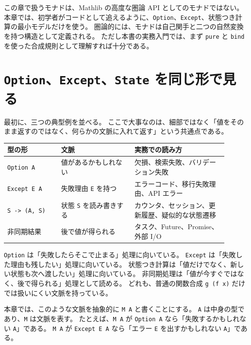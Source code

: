 
この章で扱うモナドは、Mathlib の高度な圏論 API としてのモナドではない。
本章では、初学者がコードとして追えるように、\texttt{Option}、\texttt{Except}、状態つき計算の最小モデルだけを使う。
圏論的には、モナドは自己関手と二つの自然変換を持つ構造として定義される。
ただし本書の実務入門では、まず \texttt{pure} と \texttt{bind} を使った合成規則として理解すれば十分である。

\section{\texttt{Option}、\texttt{Except}、\texttt{State} を同じ形で見る}

最初に、三つの典型例を並べる。
ここで大事なのは、細部ではなく「値をそのまま返すのではなく、何らかの文脈に入れて返す」という共通点である。

\begin{center}
\begin{tabular}{p{0.22\linewidth}p{0.30\linewidth}p{0.38\linewidth}}
\toprule
型の形 & 文脈 & 実務での読み方 \\
\midrule
\texttt{Option A} & 値があるかもしれない & 欠損、検索失敗、バリデーション失敗 \\
\texttt{Except E A} & 失敗理由 \texttt{E} を持つ & エラーコード、移行失敗理由、API エラー \\
\texttt{S -> (A, S)} & 状態 \texttt{S} を読み書きする & カウンタ、セッション、更新履歴、疑似的な状態遷移 \\
非同期結果 & 後で値が得られる & タスク、Future、Promise、外部 I/O \\
\bottomrule
\end{tabular}
\end{center}

\begin{softwarebox}
\texttt{Option} は「失敗したらそこで止まる」処理に向いている。
\texttt{Except} は「失敗した理由も残したい」処理に向いている。
状態つき計算は「値だけでなく、新しい状態も次へ渡したい」処理に向いている。
非同期処理は「値が今すぐではなく、後で得られる」処理として読める。
どれも、普通の関数合成 \texttt{g (f x)} だけでは扱いにくい文脈を持っている。
\end{softwarebox}

本章では、このような文脈を抽象的に \texttt{M A} と書くことにする。
\texttt{A} は中身の型であり、\texttt{M} は文脈を表す。
たとえば、\texttt{M A} が \texttt{Option A} なら「失敗するかもしれない \texttt{A}」である。
\texttt{M A} が \texttt{Except E A} なら「エラー \texttt{E} を出すかもしれない \texttt{A}」である。

